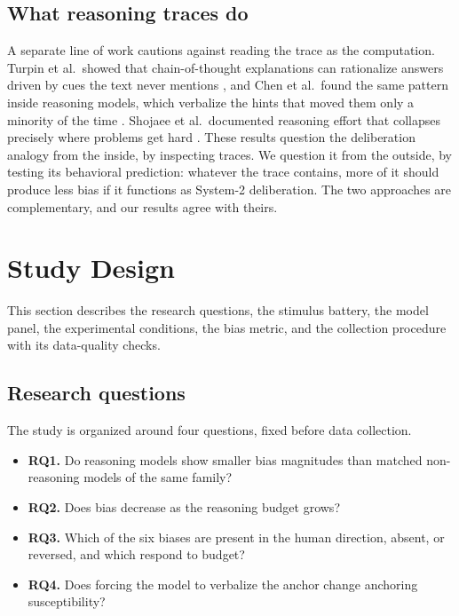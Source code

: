 \documentclass[conference]{IEEEtran}
\begin{document}
\subsection{What reasoning traces do}
A separate line of work cautions against reading the trace as the computation. Turpin et al.\ showed that chain-of-thought explanations can rationalize answers driven by cues the text never mentions \cite{turpin2023language}, and Chen et al.\ found the same pattern inside reasoning models, which verbalize the hints that moved them only a minority of the time \cite{chen2025reasoning}. Shojaee et al.\ documented reasoning effort that collapses precisely where problems get hard \cite{shojaee2025illusion}. These results question the deliberation analogy from the inside, by inspecting traces. We question it from the outside, by testing its behavioral prediction: whatever the trace contains, more of it should produce less bias if it functions as System-2 deliberation. The two approaches are complementary, and our results agree with theirs.

\section{Study Design}

This section describes the research questions, the stimulus battery, the model panel, the experimental conditions, the bias metric, and the collection procedure with its data-quality checks.

\subsection{Research questions}
The study is organized around four questions, fixed before data collection.
\begin{itemize}
\item \textbf{RQ1.} Do reasoning models show smaller bias magnitudes than matched non-reasoning models of the same family?
\item \textbf{RQ2.} Does bias decrease as the reasoning budget grows?
\item \textbf{RQ3.} Which of the six biases are present in the human direction, absent, or reversed, and which respond to budget?
\item \textbf{RQ4.} Does forcing the model to verbalize the anchor change anchoring susceptibility?
\end{itemize}
\end{document}
